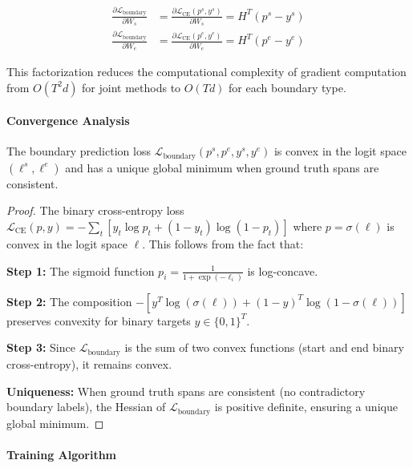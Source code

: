 \begin{align}
\frac{\partial \mathcal{L}_{\text{boundary}}}{\partial W_s} &= \frac{\partial \mathcal{L}_{\text{CE}}(p^s, y^s)}{\partial W_s} = H^T (p^s - y^s) \label{eq:start-gradient} \\
\frac{\partial \mathcal{L}_{\text{boundary}}}{\partial W_e} &= \frac{\partial \mathcal{L}_{\text{CE}}(p^e, y^e)}{\partial W_e} = H^T (p^e - y^e) \label{eq:end-gradient}
\end{align}

This factorization reduces the computational complexity of gradient computation from \(O(T^2 d)\) for joint methods to \(O(T d)\) for each boundary type.

\paragraph{Convergence Analysis}

\begin{proposition}
	\label{prop:boundary-convexity}
	The boundary prediction loss \(\mathcal{L}_{\text{boundary}}(p^s, p^e, y^s, y^e)\) is convex in the logit space \((\ell^s, \ell^e)\) and has a unique global minimum when ground truth spans are consistent.
\end{proposition}

\begin{proof}
	The binary cross-entropy loss \(\mathcal{L}_{\text{CE}}(p, y) = -\sum_t [y_t \log p_t + (1-y_t) \log (1-p_t)]\) where \(p = \sigma(\ell)\) is convex in the logit space \(\ell\). This follows from the fact that:
	
	\textbf{Step 1:} The sigmoid function \(p_i = \frac{1}{1 + \exp(-\ell_i)}\) is log-concave.
	
	\textbf{Step 2:} The composition \(-[y^T \log(\sigma(\ell)) + (1-y)^T \log(1-\sigma(\ell))]\) preserves convexity for binary targets \(y \in \{0,1\}^T\).
	
	\textbf{Step 3:} Since \(\mathcal{L}_{\text{boundary}}\) is the sum of two convex functions (start and end binary cross-entropy), it remains convex.
	
	\textbf{Uniqueness:} When ground truth spans are consistent (no contradictory boundary labels), the Hessian of \(\mathcal{L}_{\text{boundary}}\) is positive definite, ensuring a unique global minimum.
\end{proof}

\paragraph{Training Algorithm}

